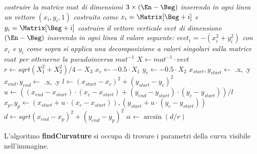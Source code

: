 \begin{algorithm}[!t]

    \BlankLine
    \BlankLine
    \emph{costruire la matrice $mat$ di dimensioni $3\times(\En-\Beg)$ inserendo in ogni linea un vettore $(x_i,y_i,1)$ costruito come $x_i=\Matrix[\Beg+i]$ e $y_i=\Matrix[\Beg+i]$}\;
    \BlankLine
    \emph{costruire il vettore verticale $vect$ di dimensione $(\En-\Beg)$ inserendo in ogni linea il valore seguente: $vect_i = -(x_i^2+y_i^2)$ con $x_i$ e $y_i$ come sopra}\;
    \BlankLine
    \emph{si applica una decomposizione a valori singolari sulla matrice $mat$ per ottenerne la pseudoinversa $mat^{-1}$}\;
    $X \leftarrow mat^{-1}\cdot vect$ 
    $r \leftarrow sqrt{(X_1^2+X_2^2)/4}-X_3$\;
    $x_c \leftarrow -0.5\cdot X_1$\;
    $y_c \leftarrow -0.5\cdot X_2$\;
    $x_{start}, y_{start} \leftarrow$ \Matrix[\Beg].x, \Matrix[\Beg].y\;
    $x_{end}, y_{end} \leftarrow$ \Matrix[\En].x, \Matrix[\En].y\;
    $l \leftarrow (x_{start}-x_c)^2+(y_{start}-y_c)^2$\;
    $u \leftarrow ((x_{end}-x_{start})\cdot (x_c-x_{start})+(y_{end}-y_{start})\cdot (y_c-y_{start}))/l$\;
    $x_p, y_p \leftarrow (x_{start}+u\cdot (x_c-x_{start})), (y_{start}+u\cdot (y_c-y_{start}))$\;
    $d \leftarrow sqrt{(x_{end}-x_p)^2+(y_{end}-y_p)^2}$
    $\alpha \leftarrow \arcsin{(d/r)}$\;
    \Return{[$\alpha, x_c, y_c, r$]}\;

    \caption{L'algoritmo \textbf{findCurvature} si occupa di trovare i parametri della curva visibile nell'immagine.}
\end{algorithm}

